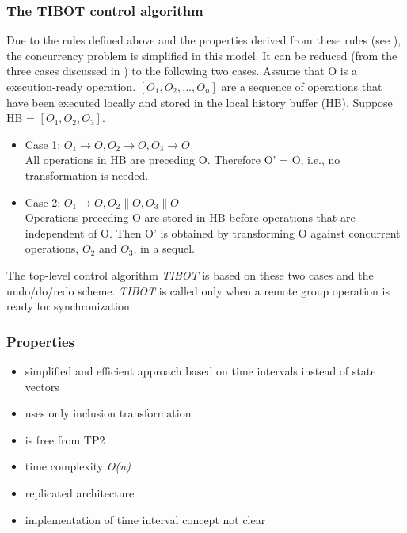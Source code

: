 \subsubsection{The TIBOT control algorithm}
Due to the rules defined above and the properties derived from these rules (see \cite{tibot}), the concurrency problem is simplified in this model. It can be reduced (from the three cases discussed in \cite{sun98b}) to the following two cases. Assume that O is a execution-ready operation. $[O_{1},O_{2},...,O_{n}]$ are a sequence of operations that have been executed locally and stored in the local history buffer (HB). Suppose HB = $[O_{1},O_{2},O_{3}]$.
\begin{itemize}
 \item Case 1: $O_{1} \rightarrow O, O_{2} \rightarrow O, O_{3} \rightarrow O$ \\
 All operations in HB are preceding O. Therefore O' = O, i.e., no transformation is needed.
 \item Case 2: $O_{1} \rightarrow O, O_{2} \parallel O, O_{3} \parallel O$ \\
 Operations preceding O are stored in HB before operations that are independent of O. Then O' is obtained by transforming O against concurrent operations, $O_{2}$ and $O_{3}$, in a sequel.
\end{itemize}

The top-level control algorithm \emph{TIBOT} is based on these two cases and the undo/do/redo scheme. \emph{TIBOT} is called only when a remote group operation is ready for synchronization.


\subsubsection{Properties}
\begin{itemize}
 \item simplified and efficient approach based on time intervals instead of state vectors
 \item uses only inclusion transformation
 \item is free from TP2
 \item time complexity \emph{O(n)}
 \item replicated architecture
 \item implementation of time interval concept not clear
\end{itemize}